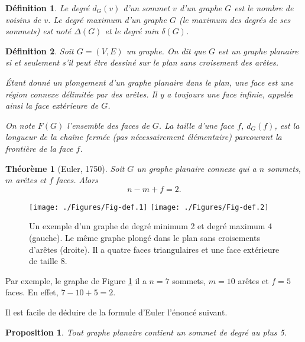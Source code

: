 \documentclass[10pt,a4paper]{article}
\newtheorem{definition}{Définition}
\newtheorem{theorem}{Théorème}
\newtheorem{proposition}{Proposition}
\begin{document}
\begin{definition}
Le \emph{degré} $d_{G}(v)$ d'un sommet $v$ d'un graphe $G$ est le nombre de voisins de $v$. Le degré maximum d'un graphe $G$ (le maximum des degrés de ses sommets) est noté $\Delta(G)$ et le degré min $\delta(G)$.
\end{definition}


\begin{definition}
Soit $G=(V,E)$ un graphe. On dit que $G$ est un graphe \emph{planaire} si et seulement s'il peut être dessiné sur le plan sans croisement des arêtes. 

Étant donné un plongement d'un graphe planaire dans le plan, une \emph{face} est une région connexe délimitée par des arêtes. Il y a toujours une face infinie, appelée ainsi la \emph{face extérieure} de $G$.

On note $F(G)$ l'ensemble des faces de $G$. La \emph{taille} d'une face $f$, $d_G(f)$, est la longueur de la chaîne fermée (pas nécessairement élémentaire) parcourant la frontière de la face $f$.
\end{definition}

\begin{theorem}[Euler, 1750]
Soit $G$ un graphe planaire connexe qui a $n$ sommets, $m$ arêtes et $f$ faces. Alors
$$
n - m + f = 2.
$$
\end{theorem}

\begin{figure}[ht]
\centerline{
\texttt{[image: ./Figures/Fig-def.1]}
\hfil
\texttt{[image: ./Figures/Fig-def.2]}
}
\caption{Un exemple d'un graphe de degré minimum 2 et degré maximum 4 (gauche). Le même graphe plongé dans le plan sans croisements d'arêtes (droite). Il a quatre faces triangulaires et une face extérieure de taille 8.}
\label{fig:ex}
\end{figure}

Par exemple, le graphe de Figure \ref{fig:ex} il a $n=7$ sommets, $m=10$ arêtes et $f=5$ faces. En effet, $7 - 10 + 5 = 2$.

Il est facile de déduire de la formule d'Euler l'énoncé suivant.

\begin{proposition}
Tout graphe planaire contient un sommet de degré au plus 5.
\end{proposition}
\end{document}
